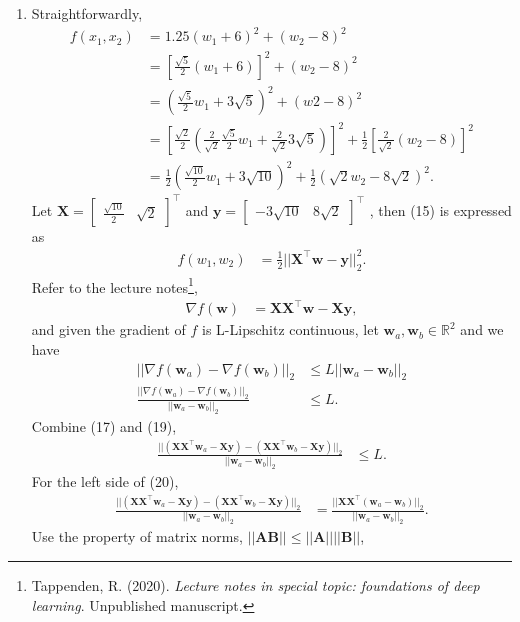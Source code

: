 \documentclass[10pt]{article}
\begin{document}
\begin{enumerate}[1)]
\item
Straightforwardly,
\begin{align}
f(x_1,x_2)&=1.25(w_1+6)^2+(w_2-8)^2\\
&=[\frac{\sqrt{5}}{2}(w_1+6)]^2+(w_2-8)^2\\
&=(\frac{\sqrt{5}}{2}w_1+3\sqrt{5})^2+(w2-8)^2\\
&=[\frac{\sqrt{2}}{2}(\frac{2}{\sqrt{2}}\frac{\sqrt{5}}{2}w_1+\frac{2}{\sqrt{2}}3\sqrt{5})]^2+\frac{1}{2}[\frac{2}{\sqrt{2}}(w_2-8)]^2\\
&=\frac{1}{2}(\frac{\sqrt{10}}{2}w_1+3\sqrt{10})^2+\frac{1}{2}(\sqrt{2}w_2-8\sqrt{2})^2.
\end{align}
Let $\pmb{X}=
  \begin{bmatrix}
    \frac{\sqrt{10}}{2} & \sqrt{2}
  \end{bmatrix}^\top$
and $\pmb{y}=
  \begin{bmatrix}
    -3\sqrt{10} & 8\sqrt{2}
  \end{bmatrix}^\top$
, then (15) is expressed as
\begin{align}
f(w_1,w_2)&=\frac{1}{2}||\pmb{X}^\top\pmb{w}-\pmb{y}||^2_2.
\end{align}
Refer to the lecture notes\footnote{\;Tappenden, R. (2020). \textit{Lecture notes in special topic: foundations of deep learning}. Unpublished manuscript.},
\begin{align}
\nabla f(\pmb{w})&=\pmb{X}\pmb{X}^\top\pmb{w}-\pmb{X}\pmb{y},
\end{align}
and given the gradient of $f$ is L-Lipschitz continuous, let $\pmb{w}_a,\pmb{w}_b\in\mathbb{R}^2$ and we have
\begin{align}
||\nabla f(\pmb{w}_a)-\nabla f(\pmb{w}_b)||_2&\leq L||\pmb{w}_a-\pmb{w}_b||_2\\
\frac{||\nabla f(\pmb{w}_a)-\nabla f(\pmb{w}_b)||_2}{||\pmb{w}_a-\pmb{w}_b||_2}&\leq L.
\end{align}
Combine (17) and (19),
\begin{align}
\frac{||(\pmb{X}\pmb{X}^\top\pmb{w}_a-\pmb{X}\pmb{y})-(\pmb{X}\pmb{X}^\top\pmb{w}_b-\pmb{X}\pmb{y})||_2}{||\pmb{w}_a-\pmb{w}_b||_2}&\leq L.
\end{align}
For the left side of (20),
\begin{align}
\frac{||(\pmb{X}\pmb{X}^\top\pmb{w}_a-\pmb{X}\pmb{y})-(\pmb{X}\pmb{X}^\top\pmb{w}_b-\pmb{X}\pmb{y})||_2}{||\pmb{w}_a-\pmb{w}_b||_2}&=
\frac{||\pmb{X}\pmb{X}^\top(\pmb{w}_a-\pmb{w}_b)||_2}{||\pmb{w}_a-\pmb{w}_b||_2}.
\end{align}
Use the property of matrix norms, $||\pmb{A}\pmb{B}||\leq||\pmb{A}||||\pmb{B}||$,

\end{enumerate}
\end{document}
